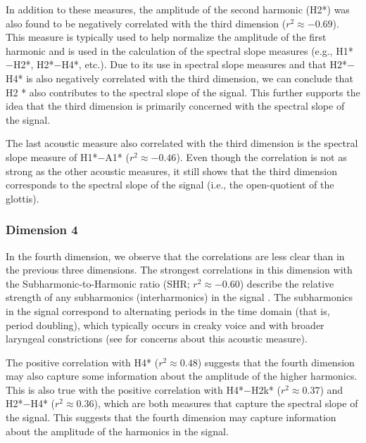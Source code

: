 In addition to these measures, the amplitude of the second harmonic (H2*) was also found to be negatively correlated with the third dimension ($r^{2} \approx -0.69$). This measure is typically used to help normalize the amplitude of the first harmonic and is used in the calculation of the spectral slope measures (e.g., H1*$-$H2*, H2*$-$H4*, etc.). Due to its use in spectral slope measures and that H2*$-$H4* is also negatively correlated with the third dimension, we can conclude that H2 * also contributes to the spectral slope of the signal. This further supports the idea that the third dimension is primarily concerned with the spectral slope of the signal. 

The last acoustic measure also correlated with the third dimension is the spectral slope measure of H1*$-$A1* ($r^{2} \approx -0.46$). Even though the correlation is not as strong as the other acoustic measures, it still shows that the third dimension corresponds to the spectral slope of the signal (i.e., the open-quotient of the glottis).

\subsubsection{Dimension 4} \label{sec:acousticlandscape:dim4}

In the fourth dimension, we observe that the correlations are less clear than in the previous three dimensions. The strongest correlations in this dimension with the Subharmonic-to-Harmonic ratio (SHR; $r^{2} \approx -0.60$) describe the relative strength of any subharmonics (interharmonics) in the signal \citep{sunPitchDeterminationVoice2002}. The subharmonics in the signal correspond to alternating periods in the time domain (that is, period doubling), which typically occurs in creaky voice and with broader laryngeal constrictions (see \cite{herbstPerformanceEvaluationSubharmonictoHarmonic2021} for concerns about this acoustic measure). 

The positive correlation with H4* ($r^{2} \approx 0.48$) suggests that the fourth dimension may also capture some information about the amplitude of the higher harmonics. This is also true with the positive correlation with H4*$-$H2k* ($r^{2} \approx 0.37$) and H2*$-$H4* ($r^{2} \approx 0.36$), which are both measures that capture the spectral slope of the signal. This suggests that the fourth dimension may capture information about the amplitude of the harmonics in the signal. 

